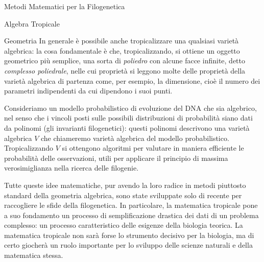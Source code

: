 \documentclass{article}
\begin{document}
\begin{section}{Metodi Matematici per la Filogenetica}
\begin{subsection}{Algebra Tropicale}
\begin{subsubsection}{Geometria}
			In generale è possibile anche tropicalizzare una qualsiasi varietà algebrica: la cosa fondamentale è che, tropicalizzando, si ottiene un oggetto geometrico più semplice, una sorta di \emph{poliedro} con alcune facce infinite, detto \emph{complesso poliedrale}, nelle cui proprietà si leggono molte delle proprietà della varietà algebrica di partenza come, per esempio, la dimensione, cioè il numero dei parametri indipendenti da cui dipendono i suoi punti.
			
			Consideriamo un modello probabilistico di evoluzione del DNA che sia algebrico, nel senso che i vincoli posti sulle possibili distribuzioni di probabilità siano dati da polinomi (gli invarianti filogenetici): questi polinomi descrivono una varietà algebrica $V$ che chiameremo varietà algebrica del modello probabilistico. Tropicalizzando $V$ si ottengono algoritmi per valutare in maniera efficiente le probabilità delle osservazioni, utili per applicare il principio di massima verosimiglianza nella ricerca delle filogenie.
			
			Tutte queste idee matematiche, pur avendo la loro radice in metodi piuttosto standard della geometria algebrica, sono state sviluppate solo di recente per raccogliere le sfide della filogenetica. In particolare, la matematica tropicale pone a suo fondamento un processo di semplificazione drastica dei dati di un problema complesso: un processo caratteristico delle esigenze della biologia teorica. La matematica tropicale non sarà forse lo strumento decisivo per la biologia, ma di certo giocherà un ruolo importante per lo sviluppo delle scienze naturali e della matematica stessa.
			\end{subsubsection}
		\end{subsection}
	
	\end{section}
\end{document}
